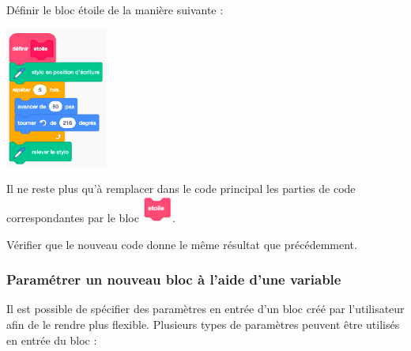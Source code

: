 
Définir le bloc étoile de la manière suivante : 
 \begin{center}
 \includegraphics[width=0.25\textwidth]{./images/scratch03/fonction/definirBloc.png}
 \end{center}

Il ne reste plus qu’à remplacer dans le code principal les parties de code correspondantes par le bloc  \includegraphics[width=1cm]{./images/scratch03/fonction/bloc.png}. 

Vérifier que le nouveau code donne le même résultat que précédemment.


\subsubsection{Paramétrer un nouveau bloc à l’aide d’une variable}

Il est possible de spécifier des paramètres en entrée d’un bloc créé par l’utilisateur afin de le rendre plus flexible. Plusieurs types de paramètres peuvent être utilisés en entrée du bloc :

